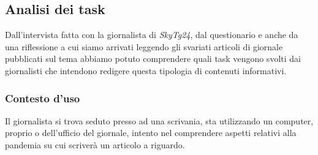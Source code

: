 \subsection{Analisi dei task}
Dall'intervista fatta con la giornalista di \textit{SkyTg24}, dal questionario e anche da una riflessione a cui siamo arrivati leggendo gli svariati articoli di giornale pubblicati sul tema abbiamo potuto comprendere quali task vengono svolti dai giornalisti che intendono redigere questa tipologia di contenuti informativi.

\subsubsection{Contesto d'uso}
Il giornalista si trova seduto presso ad una scrivania, sta utilizzando un computer, proprio o dell'ufficio del giornale, intento nel comprendere aspetti relativi alla pandemia su cui scriverà un articolo a riguardo.

